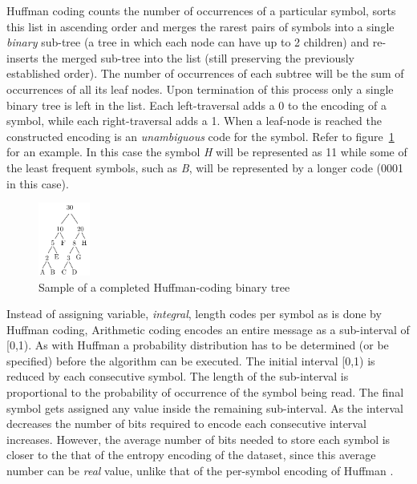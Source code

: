 Huffman coding counts the number of occurrences of a particular symbol, sorts this list in ascending order and merges the rarest pairs of symbols into a single \textit{binary} 
sub-tree (a tree in which each node can have up to 2 children) and re-inserts the merged sub-tree into the list (still preserving the previously established order). The number of occurrences 
of each subtree will be the sum of occurrences of all its leaf nodes. Upon termination of this process only a single binary tree is left in the list. Each left-traversal adds a 0 to the encoding 
of a symbol, while each right-traversal adds a 1. When a leaf-node is reached the constructed encoding is an \textit{unambiguous} code for the symbol. Refer to figure~\ref{HUFFMAN} for an example.
In this case the symbol \textit{H} will be represented as 11 while some of the least frequent symbols, such as \textit{B}, will be represented by a longer code (0001 in this case).
\begin{figure}[h!]
\begin{mdframed}
 \centering
 \includegraphics[width=0.15\textwidth]{huffmanTree.png}
 \caption{Sample of a completed Huffman-coding binary tree \cite[p. 70]{salomon2004data}}
 \label{HUFFMAN}
\end{mdframed}
\end{figure}

Instead of assigning variable, \textit{integral}, length codes per symbol as is done by Huffman coding, Arithmetic coding encodes an entire message as a sub-interval of [0,1). As with
Huffman a probability distribution has to be determined (or be specified) before the algorithm can be executed. The initial interval [0,1) is reduced by each consecutive 
symbol. The length of the sub-interval is proportional to the probability of occurrence of the symbol being read. The final symbol gets assigned any value inside the remaining 
sub-interval. As the interval decreases the number of bits required to encode each consecutive interval increases. However, the average number of bits needed to store 
each symbol is closer to the that of the entropy encoding of the dataset, since this average number can be \textit{real} value, unlike that of the per-symbol encoding of Huffman \cite[ch. 2]{salomon2004data}.

